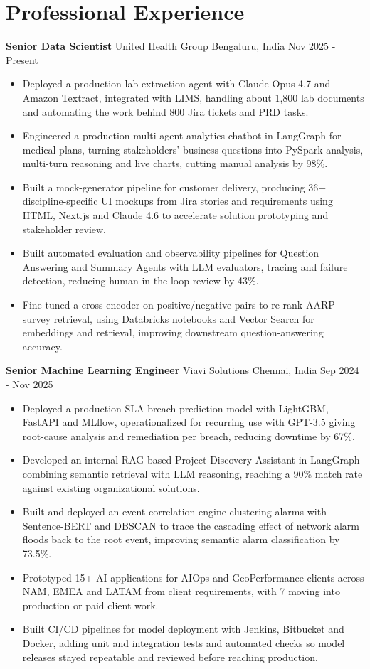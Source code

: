 \documentclass[10pt,a4paper]{article}
\newcommand{\role}[4]{\textbf{#1} \textbar{} #2 \hfill #3 \textbar{} #4\par}
\begin{document}
\section{Professional Experience}
\role{Senior Data Scientist}{United Health Group}{Bengaluru, India}{Nov 2025 - Present}
\begin{itemize}
  \item Deployed a production lab-extraction agent with Claude Opus 4.7 and Amazon Textract, integrated with LIMS, handling about 1,800 lab documents and automating the work behind 800 Jira tickets and PRD tasks.
  \item Engineered a production multi-agent analytics chatbot in LangGraph for medical plans, turning stakeholders' business questions into PySpark analysis, multi-turn reasoning and live charts, cutting manual analysis by 98\%.
  \item Built a mock-generator pipeline for customer delivery, producing 36+ discipline-specific UI mockups from Jira stories and requirements using HTML, Next.js and Claude 4.6 to accelerate solution prototyping and stakeholder review.
  \item Built automated evaluation and observability pipelines for Question Answering and Summary Agents with LLM evaluators, tracing and failure detection, reducing human-in-the-loop review by 43\%.
  \item Fine-tuned a cross-encoder on positive/negative pairs to re-rank AARP survey retrieval, using Databricks notebooks and Vector Search for embeddings and retrieval, improving downstream question-answering accuracy.
\end{itemize}
\vspace{3pt}
\role{Senior Machine Learning Engineer}{Viavi Solutions}{Chennai, India}{Sep 2024 - Nov 2025}
\begin{itemize}
  \item Deployed a production SLA breach prediction model with LightGBM, FastAPI and MLflow, operationalized for recurring use with GPT-3.5 giving root-cause analysis and remediation per breach, reducing downtime by 67\%.
  \item Developed an internal RAG-based Project Discovery Assistant in LangGraph combining semantic retrieval with LLM reasoning, reaching a 90\% match rate against existing organizational solutions.
  \item Built and deployed an event-correlation engine clustering alarms with Sentence-BERT and DBSCAN to trace the cascading effect of network alarm floods back to the root event, improving semantic alarm classification by 73.5\%.
  \item Prototyped 15+ AI applications for AIOps and GeoPerformance clients across NAM, EMEA and LATAM from client requirements, with 7 moving into production or paid client work.
  \item Built CI/CD pipelines for model deployment with Jenkins, Bitbucket and Docker, adding unit and integration tests and automated checks so model releases stayed repeatable and reviewed before reaching production.
\end{itemize}
\end{document}
